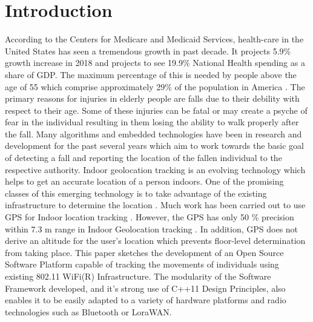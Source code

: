 \documentclass[conference]{IEEEtran}
\begin{document}
\section{Introduction}
According to the Centers for Medicare and Medicaid Services, health-care in the United States has seen a tremendous growth in past decade. It projects 5.9\% growth increase in 2018 and projects to see 19.9\% National Health spending as a share of GDP. The maximum percentage of this is needed by people above the age of 55 which comprise approximately 29\% of the population in America \cite{hi}. The primary reasons for injuries in elderly people are falls due to their debility with respect to their age. Some of these injuries can be fatal or may create a psyche of fear in the individual resulting in them losing the ability to walk properly after the fall. Many algorithms and embedded technologies have been in research and development for the past several years which aim to work towards the basic goal of detecting a fall and reporting the location of the fallen individual to the respective authority.
\newline Indoor geolocation tracking is an evolving technology which helps to get an accurate location of a person indoors. One of the promising classes of this emerging technology is to take advantage of the existing infrastructure to determine the location \cite{pahlavan2002indoor}. Much work has been carried out to use GPS for Indoor location tracking \cite{kjaergaard2010indoor}. However, the GPS has only 50 \% precision within 7.3 m range in Indoor Geolocation tracking \cite{liu2007survey}. In addition, GPS does not derive an altitude for the user's location which prevents floor-level determination from taking place. 
\newline This paper sketches the development of an Open Source Software Platform capable of tracking the movements of individuals using existing 802.11 WiFi(R) Infrastructure. The modularity of the Software Framework developed, and it's strong use of C++11 Design Principles, also enables it to be easily adapted to a variety of hardware platforms and radio technologies such as Bluetooth or LoraWAN.
\end{document}
